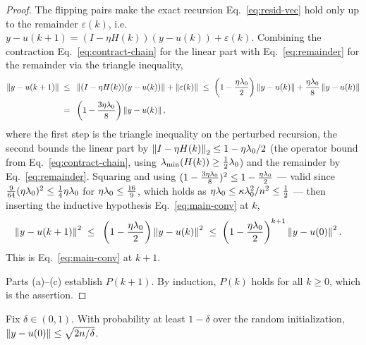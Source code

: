 \begin{proof}
The flipping pairs make the exact recursion Eq.~\eqref{eq:resid-vec} hold only up to the
remainder $\varepsilon(k)$, i.e.\ $y - u(k+1) = (I - \eta H(k))(y - u(k)) + \varepsilon(k)$.
Combining the contraction Eq.~\eqref{eq:contract-chain} for the linear part with
Eq.~\eqref{eq:remainder} for the remainder via the triangle inequality,
\begin{align}\label{eq:contract-kp1}
\left\|  y - u(k+1)  \right\|
\;\le\; & ~ \left\|  (I - \eta H(k))(y - u(k))  \right\| + \left\|  \varepsilon(k)  \right\|
\;\le\; \left( 1 - \frac{\eta\lambda_{0}}{2} \right) \left\|  y - u(k)  \right\|
+ \frac{\eta\lambda_{0}}{8} \left\|  y - u(k)  \right\| \\
\;=\; & ~ \left( 1 - \frac{3\eta\lambda_{0}}{8} \right) \left\|  y - u(k)  \right\|,
\end{align}
where the first step is the triangle inequality on the perturbed recursion, the second bounds
the linear part by $\left\| I - \eta H(k) \right\|_2 \le 1 - \eta\lambda_{0}/2$ (the operator bound from
Eq.~\eqref{eq:contract-chain}, using $\lambda_{\min}(H(k)) \ge \tfrac12\lambda_{0}$) and the remainder by
Eq.~\eqref{eq:remainder}. Squaring and using
$(1 - \tfrac{3\eta\lambda_{0}}{8})^2 \le 1 - \tfrac{\eta\lambda_{0}}{2}$ --- valid since
$\tfrac{9}{64}(\eta\lambda_{0})^2 \le \tfrac14\eta\lambda_{0}$ for $\eta\lambda_{0} \le \tfrac{16}{9}$, which
holds as $\eta\lambda_{0} \le \kappa\lambda_{0}^2/n^2 \le \tfrac12$ --- then inserting the inductive
hypothesis Eq.~\eqref{eq:main-conv} at $k$,
\begin{align}\label{eq:contract-kp1-sq}
\left\|  y - u(k+1)  \right\|^2
\;\le\; & ~ \left( 1 - \frac{\eta\lambda_{0}}{2} \right) \left\|  y - u(k)  \right\|^2
\;\le\; \left( 1 - \frac{\eta\lambda_{0}}{2} \right)^{k+1} \left\|  y - u(0)  \right\|^2 .
\end{align}
This is Eq.~\eqref{eq:main-conv} at $k+1$.

\smallskip
Parts (a)--(c) establish $P(k+1)$. By induction, $P(k)$ holds for all $k \ge 0$, which is the
assertion.
\end{proof}

\begin{lemma}\label{lem:init-residual}
Fix $\delta \in (0,1)$. With probability at least $1 - \delta$ over the random initialization,
$\left\|  y - u(0)  \right\| \le \sqrt{2n/\delta}$.
\end{lemma}

